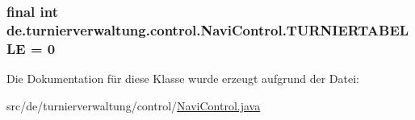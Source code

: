 \subsubsection[{\texorpdfstring{T\+U\+R\+N\+I\+E\+R\+T\+A\+B\+E\+L\+LE}{TURNIERTABELLE}}]{\setlength{\rightskip}{0pt plus 5cm}final int de.\+turnierverwaltung.\+control.\+Navi\+Control.\+T\+U\+R\+N\+I\+E\+R\+T\+A\+B\+E\+L\+LE = 0\hspace{0.3cm}{\ttfamily [static]}}\hypertarget{classde_1_1turnierverwaltung_1_1control_1_1_navi_control_a1ffa3df67e4e46df8914c34c646b6de3}{}\label{classde_1_1turnierverwaltung_1_1control_1_1_navi_control_a1ffa3df67e4e46df8914c34c646b6de3}


Die Dokumentation für diese Klasse wurde erzeugt aufgrund der Datei\+:\begin{DoxyCompactItemize}
\item 
src/de/turnierverwaltung/control/\hyperlink{_navi_control_8java}{Navi\+Control.\+java}\end{DoxyCompactItemize}
